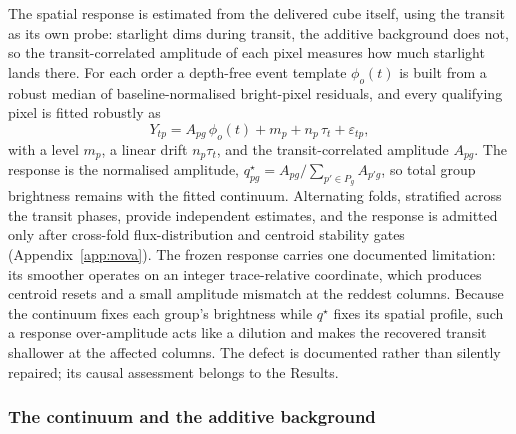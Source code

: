 
The spatial response is estimated from the delivered cube itself, using
the transit as its own probe: starlight dims during transit, the additive
background does not, so the transit-correlated amplitude of each pixel
measures how much starlight lands there. For each order a depth-free
event template $\phi_o(t)$ is built from a robust median of
baseline-normalised bright-pixel residuals, and every qualifying pixel is
fitted robustly as
\begin{equation}
 Y_{tp} = A_{pg}\,\phi_{o}(t) + m_p + n_p\,\tau_t + \varepsilon_{tp},
 \label{eq:qstar-fit}
\end{equation}
with a level $m_p$, a linear drift $n_p\tau_t$, and the transit-correlated
amplitude $A_{pg}$. The response is the normalised amplitude,
$q^\star_{pg}=A_{pg}/\sum_{p'\in P_g}A_{p'g}$, so total group brightness
remains with the fitted continuum. Alternating folds, stratified across
the transit phases, provide independent estimates, and the response is
admitted only after cross-fold flux-distribution and centroid stability
gates (Appendix~\ref{app:nova}). The frozen response carries one
documented limitation: its smoother operates on an integer trace-relative
coordinate, which produces centroid resets and a small amplitude mismatch
at the reddest columns. Because the continuum fixes each group's
brightness while $q^\star$ fixes its spatial profile, such a response
over-amplitude acts like a dilution and makes the recovered transit
shallower at the affected columns. The defect is documented rather than
silently repaired; its causal assessment belongs to the Results.

\subsubsection{The continuum and the additive background}


